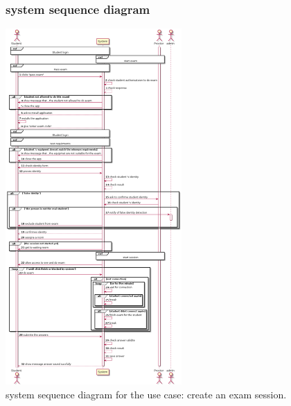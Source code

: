 \documentclass[]{uc2pfecaneva}
\begin{document}
    \begin{figure}[]
        \subsubsection{system sequence diagram}
        \centering
        \includegraphics[width=0.6\textwidth]{images/pass_exam}

        \caption{system sequence diagram for the use case: create an exam session.}
    \end{figure}
    \clearpage
\end{document}
